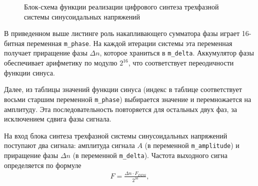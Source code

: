         \begin{figure}[h!]
            \caption{Блок-схема функции реализации цифрового синтеза трехфазной
                системы синусоидальных напряжений}
            \label{fig:bs-dds}
        \end{figure}

        В приведенном выше листинге роль накапливающего сумматора фазы играет
        16-битная переменная \verb"m_phase". На каждой итерации системы эта
        переменная получает приращение фазы $\Delta n$, которое храниться в
        \verb"m_delta". Аккумулятор фазы обеспечивает арифметику по модулю
        $2^{16}$, что соответствует переодичности функции синуса. 

        Далее, из таблицы значений функции синуса (индекс в таблице
        соответствует восьми старшим переменной \verb"m_phase") выбирается
        значение и перемножается на амплитуду. Эта последовательность
        повторяется для остальных двух фаз, за исключением сдвига фазы сигнала.

        На вход блока синтеза трехфазной системы синусоидальных напряжений
        поступают два сигнала: амплитуда сигнала $A$ (в переменной
        \verb"m_amplitude") и приращение фазы $\Delta n$ (в переменной
        \verb"m_delta"). Частота выходного сигна определяется по формуле
        \begin{gather*}
            F = \frac{\Delta n \cdot F_{DDS}}{2^{16}},
        \end{gather*}

